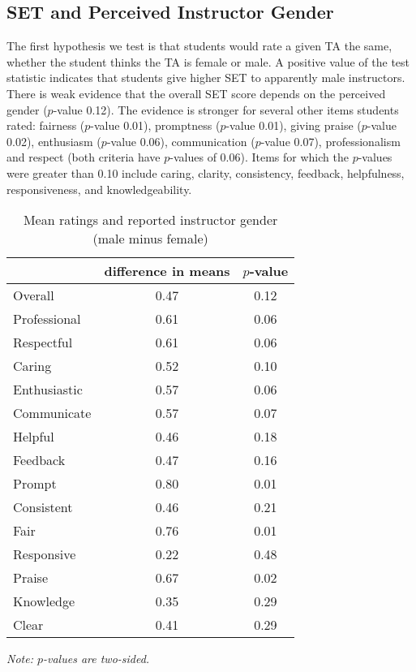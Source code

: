 \documentclass[12pt]{article}
\newcommand{\todo}[1]{{\color{red}{TO DO: \sc #1}}}
\begin{document}
\subsection{SET and Perceived Instructor Gender}
\todo{make sure the category names make sense in the prose}
The first hypothesis we test is that students would rate a given TA the same,
whether the student thinks the TA is female or male. 
A positive value of the test statistic indicates that students give higher SET
to apparently male instructors.
There is weak evidence that the overall SET score depends on the perceived gender ($p$-value 0.12). 
The evidence is stronger for several other items students rated: fairness ($p$-value 0.01), 
promptness ($p$-value 0.01), giving praise ($p$-value 0.02), 
enthusiasm ($p$-value 0.06), communication ($p$-value 0.07), professionalism and respect 
(both criteria have $p$-values of 0.06). 
Items for which the $p$-values were greater than 0.10 include caring, clarity,
consistency, feedback, helpfulness, responsiveness, and knowledgeability.

\begin{table}[htbp]
  \centering
  \footnotesize 
  \caption{Mean ratings and reported instructor gender (male minus female)}
    \begin{tabular}{lcc}
    \toprule 
                          & difference in means  & $p$-value  \\
   \midrule
    Overall &                 0.47       & 0.12   \\
    Professional &            0.61       & 0.06   \\
    Respectful			   &  0.61       & 0.06   \\
    Caring &                  0.52       & 0.10    \\
    Enthusiastic   &          0.57       & 0.06     \\
    Communicate        &      0.57       & 0.07     \\
    Helpful   &               0.46       & 0.18     \\
    Feedback   &              0.47       & 0.16     \\
    Prompt    &               0.80       & 0.01     \\
    Consistent   &            0.46       & 0.21     \\
    Fair   &                  0.76       & 0.01     \\
    Responsive   &            0.22       & 0.48     \\
    Praise   &                0.67       & 0.02     \\
    Knowledge   &             0.35       & 0.29     \\
    Clear   &                 0.41       & 0.29     \\
    \bottomrule
    \end{tabular}%
 \label{tab:macnell1}%
  
  \textit{Note: $p$-values are two-sided.}
\end{table}%
\normalsize
\end{document}
